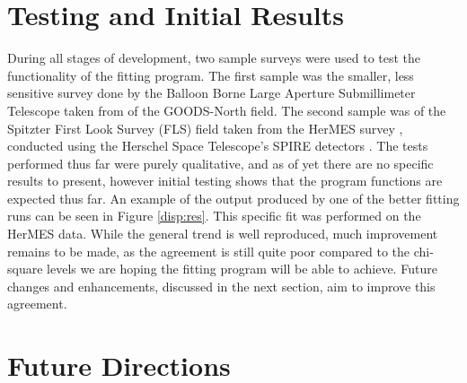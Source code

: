 \documentclass[twocolumn,letterpaper,10pt]{article}
\begin{document}
\section{Testing and Initial Results}\label{example}
During all stages of development, two sample surveys were used to test the functionality of the fitting program. The first sample was the smaller, less sensitive survey done by the Balloon Borne Large Aperture Submillimeter Telescope taken from \citet{Devlin09} of the GOODS-North field. The second sample was of the Spitzter First Look Survey (FLS) field taken from the HerMES survey \citep{HerMES}, conducted using the Herschel Space Telescope's SPIRE detectors \citep{Herschel,SPIRE}. The tests performed thus far were purely qualitative, and as of yet there are no specific results to present, however initial testing shows that the program functions are expected thus far. An example of the output produced by one of the better fitting runs can be seen in Figure \ref{disp:res}. This specific fit was performed on the HerMES data. While the general trend is well reproduced, much improvement remains to be made, as the agreement is still quite poor compared to the chi-square levels we are hoping the fitting program will be able to achieve. Future changes and enhancements, discussed in the next section, aim to improve this agreement.

\section{Future Directions}\label{fdirs}
\end{document}
